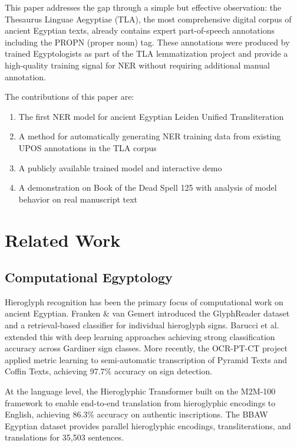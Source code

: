 \documentclass[11pt]{article}
\begin{document}
This paper addresses the gap through a simple but effective observation: the Thesaurus Linguae Aegyptiae (TLA), the most comprehensive digital corpus of ancient Egyptian texts, already contains expert part-of-speech annotations including the PROPN (proper noun) tag. These annotations were produced by trained Egyptologists as part of the TLA lemmatization project and provide a high-quality training signal for NER without requiring additional manual annotation.

The contributions of this paper are:

\begin{enumerate}
    \item The first NER model for ancient Egyptian Leiden Unified Transliteration
    \item A method for automatically generating NER training data from existing UPOS annotations in the TLA corpus
    \item A publicly available trained model and interactive demo
    \item A demonstration on Book of the Dead Spell 125 with analysis of model behavior on real manuscript text
\end{enumerate}

\section{Related Work}

\subsection{Computational Egyptology}

Hieroglyph recognition has been the primary focus of computational work on ancient Egyptian. Franken \& van Gemert \cite{franken2013} introduced the GlyphReader dataset and a retrieval-based classifier for individual hieroglyph signs. Barucci et al.\ \cite{barucci2021} extended this with deep learning approaches achieving strong classification accuracy across Gardiner sign classes. More recently, the OCR-PT-CT project \cite{ocrptct2022} applied metric learning to semi-automatic transcription of Pyramid Texts and Coffin Texts, achieving 97.7\% accuracy on sign detection.

At the language level, the Hieroglyphic Transformer \cite{hieroglyphic2024} built on the M2M-100 framework to enable end-to-end translation from hieroglyphic encodings to English, achieving 86.3\% accuracy on authentic inscriptions. The BBAW Egyptian dataset provides parallel hieroglyphic encodings, transliterations, and translations for 35,503 sentences.
\end{document}
